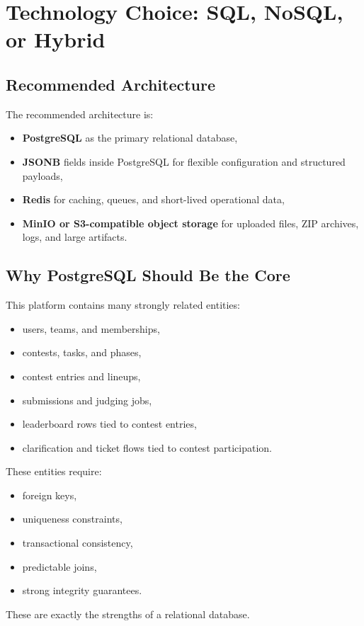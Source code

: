 \documentclass[11pt,a4paper]{article}
\begin{document}
\section{Technology Choice: SQL, NoSQL, or Hybrid}
\subsection{Recommended Architecture}
The recommended architecture is:
\begin{itemize}
    \item \textbf{PostgreSQL} as the primary relational database,
    \item \textbf{JSONB} fields inside PostgreSQL for flexible configuration and structured payloads,
    \item \textbf{Redis} for caching, queues, and short-lived operational data,
    \item \textbf{MinIO or S3-compatible object storage} for uploaded files, ZIP archives, logs, and large artifacts.
\end{itemize}

\subsection{Why PostgreSQL Should Be the Core}
This platform contains many strongly related entities:
\begin{itemize}
    \item users, teams, and memberships,
    \item contests, tasks, and phases,
    \item contest entries and lineups,
    \item submissions and judging jobs,
    \item leaderboard rows tied to contest entries,
    \item clarification and ticket flows tied to contest participation.
\end{itemize}

These entities require:
\begin{itemize}
    \item foreign keys,
    \item uniqueness constraints,
    \item transactional consistency,
    \item predictable joins,
    \item strong integrity guarantees.
\end{itemize}

These are exactly the strengths of a relational database.
\end{document}
